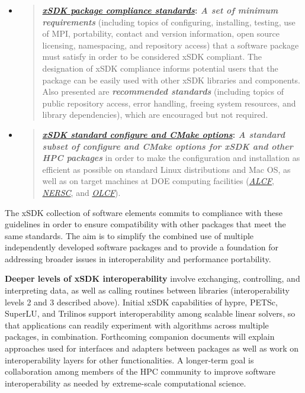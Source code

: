 \documentclass[]{article}
\begin{document}
\begin{itemize}
\item
  \begin{quote}
  \textbf{\href{https://docs.google.com/document/d/1DCx2Duijb0COESCuxwEEK1j0BPe2cTIJ-AjtJxt3290/edit\#heading=h.3hcywq83w3x0}{\emph{xSDK
  package compliance standards}}: \emph{A set of minimum requirements}}
  (including topics of configuring, installing, testing, use of MPI,
  portability, contact and version information, open source licensing,
  namespacing, and repository access) that a software package must
  satisfy in order to be considered xSDK compliant. The designation of
  xSDK compliance informs potential users that the package can be easily
  used with other xSDK libraries and components. Also presented are
  \emph{\textbf{recommended standards}} (including topics of public
  repository access, error handling, freeing system resources, and
  library dependencies), which are encouraged but not required.
  \end{quote}
\item
  \begin{quote}
  \textbf{\href{https://docs.google.com/document/d/18028D6nsuhIrCvJnX6c07r8m_Np4SH-aGXMX4svMs1w/edit\#heading=h.3hcywq83w3x0}{\emph{xSDK
  standard configure and CMake options}}: \emph{A standard subset of
  configure and CMake options for xSDK and other HPC packages}} in order
  to make the configuration and installation as efficient as possible on
  standard Linux distributions and Mac OS, as well as on target machines
  at DOE computing facilities
  (\href{http://www.alcf.anl.gov/}{\emph{ALCF}},
  \href{http://www.nersc.gov/}{\emph{NERSC}}, and
  \href{https://www.olcf.ornl.gov/}{\emph{OLCF}}).
  \end{quote}
\end{itemize}

The xSDK collection of software elements commits to compliance with
these guidelines in order to ensure compatibility with other packages
that meet the same standards. The aim is to simplify the combined use of
multiple independently developed software packages and to provide a
foundation for addressing broader issues in interoperability and
performance portability.

\textbf{Deeper levels of xSDK interoperability} involve exchanging,
controlling, and interpreting data, as well as calling routines between
libraries (interoperability levels 2 and 3 described above). Initial
xSDK capabilities of hypre, PETSc, SuperLU, and Trilinos support
interoperability among scalable linear solvers, so that applications can
readily experiment with algorithms across multiple packages, in
combination. Forthcoming companion documents will explain approaches
used for interfaces and adapters between packages as well as work on
interoperability layers for other functionalities. A longer-term goal is
collaboration among members of the HPC community to improve software
interoperability as needed by extreme-scale computational science.\pagebreak 
\end{document}
